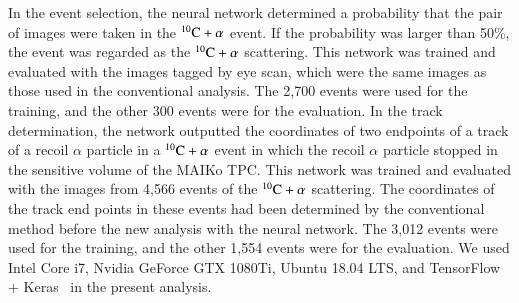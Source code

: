 \documentclass{jps-cp}
\begin{document}
In the event selection, the neural network determined a probability that the pair of images were taken
in the ${}^{10}\rm{C}+\alpha$ event.
If the probability was larger than 50\%, the event was regarded as the ${}^{10}\rm{C}+\alpha$ scattering.
This network was trained and evaluated with the images tagged by eye scan,
which were the same images as those used in the conventional analysis.
The 2,700 events were used for the training, and the other 300 events were for the evaluation.
In the track determination, the network outputted the coordinates of two endpoints of
a track of a recoil $\alpha$ particle in a ${}^{10}\rm{C}+\alpha$ event in which the recoil $\alpha$ particle stopped
in the sensitive volume of the MAIKo TPC.
This network was trained and evaluated with the images from 4,566 events of the ${}^{10}\rm{C}+\alpha$ scattering.
The coordinates of the track end points in these events had been determined by the conventional method
before the new analysis with the neural network.
The 3,012 events were used for the training, and the other 1,554 events were for the evaluation.
We used Intel Core i7, Nvidia GeForce GTX 1080Ti, Ubuntu 18.04 LTS, and
TensorFlow~\cite{tensorflow} + Keras~\cite{keras} in the present analysis.
\end{document}
